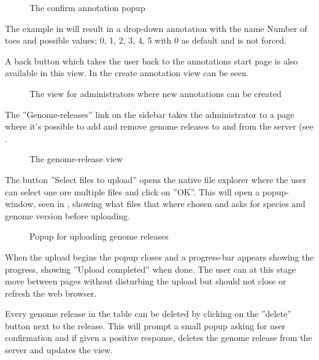 \begin{figure}[h]
 \caption{The confirm annotation popup}
 \label{adm_web_createPopup}
\end{figure}

The example in  will result in a drop-down annotation with the name Number of toes and possible values: 0, 1, 2, 3, 4, 5 with 0 as default and is not forced.

A back button which takes the user back to the annotations start page is also available in this view. In  the create annotation view can be seen.

\begin{figure}[t]
 \caption{The view for administrators where new annotations can be created}
 \label{adm_web_createView}
\end{figure}

The ''Genome-releases'' link on the sidebar takes the administrator to a page where it's possible to add and remove genome releases to and from the server (see .

\begin{figure}[h]
 \caption{The genome-release view}
 \label{adm_web_genomereleaseView}
\end{figure}

The button ''Select files to upload'' opens the native file explorer where the user can select one ore multiple files and click on ''OK''. This will open a popup-window, seen in , showing what files that where chosen and asks for species and genome version before uploading. 

\begin{figure}[h]
 \caption{Popup for uploading genome releases}
 \label{adm_web_uploadconfirm}
\end{figure}

When the upload begins the popup closes and a progress-bar appears showing the progress, showing ''Upload completed'' when done. The user can at this stage move between pages without disturbing the upload but should not close or refresh the web browser. 

Every genome release in the table can be deleted by clicking on the ''delete'' button next to the release. This will prompt a small popup asking for user confirmation and if given a positive response, deletes the genome release from the server and updates the view. 

